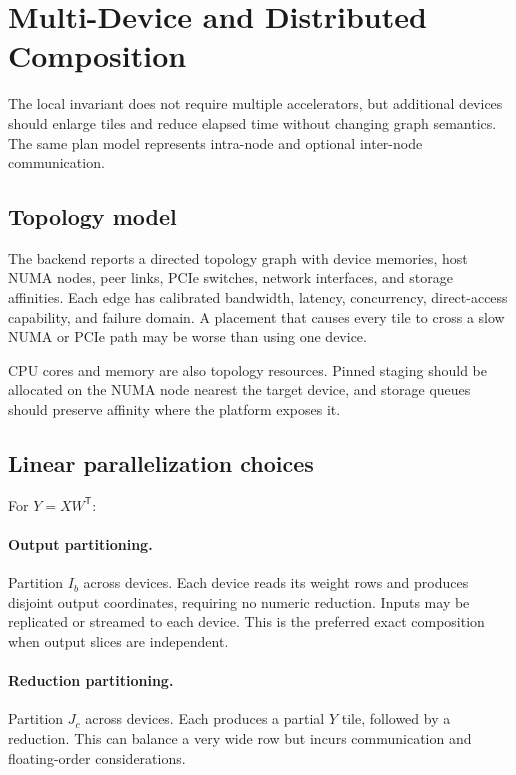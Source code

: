 \section{Multi-Device and Distributed Composition}
\label{sec:multidevice}

The local invariant does not require multiple accelerators, but additional devices should enlarge tiles and reduce elapsed time without changing graph semantics. The same plan model represents intra-node and optional inter-node communication.

\subsection{Topology model}

The backend reports a directed topology graph with device memories, host NUMA nodes, peer links, PCIe switches, network interfaces, and storage affinities. Each edge has calibrated bandwidth, latency, concurrency, direct-access capability, and failure domain. A placement that causes every tile to cross a slow NUMA or PCIe path may be worse than using one device.

CPU cores and memory are also topology resources. Pinned staging should be allocated on the NUMA node nearest the target device, and storage queues should preserve affinity where the platform exposes it.

\subsection{Linear parallelization choices}

For $Y=XW^{\mathsf T}$:

\paragraph{Output partitioning.}
Partition $I_b$ across devices. Each device reads its weight rows and produces disjoint output coordinates, requiring no numeric reduction. Inputs may be replicated or streamed to each device. This is the preferred exact composition when output slices are independent.

\paragraph{Reduction partitioning.}
Partition $J_c$ across devices. Each produces a partial $Y$ tile, followed by a reduction. This can balance a very wide row but incurs communication and floating-order considerations.

